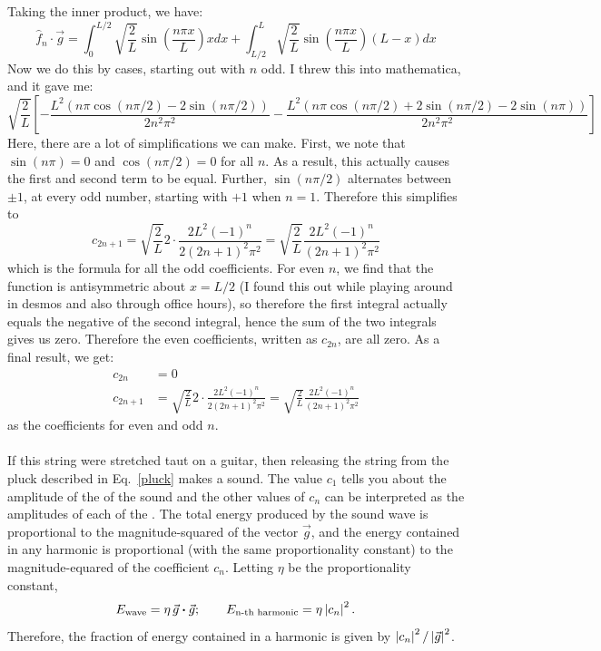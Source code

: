 \documentclass{article}
\begin{document}
\begin{solution}
    Taking the inner product, we have: 
    \[ \hat f_n \cdot \vec g = \int_0^{L/2} \sqrt{\frac 2L} \sin\left( \frac{n \pi x}{L}\right) x dx + \int_{L/2}^L \sqrt{\frac 2L } \sin \left( \frac{n \pi x}{L}\right) (L - x) dx \]
    Now we do this by cases, starting out with $n$ odd. I threw this into mathematica, and it gave me: %
    \[ \sqrt{\frac 2L} \left[ -\frac{L^2(n \pi \cos(n \pi /2) - 2 \sin(n \pi /2))}{2n^2\pi^2} - \frac{L^2(n \pi \cos(n \pi /2) + 2\sin(n \pi /2) - 2 \sin (n\pi))}{2n^2 \pi^2}\right] \]
    Here, there are a lot of simplifications we can make. First, we note that $\sin(n \pi) = 0$ and $\cos(n \pi/2) = 0$ for all $n$. As a result, this actually causes the first and second term to be equal. Further, $\sin(n \pi/2)$ alternates between $\pm 1$, at every odd number, starting with $+1$ when $n = 1$. Therefore this simplifies to
    \[c_{2n + 1} = \sqrt{\frac 2L} 2 \cdot \frac{2L^2(-1)^n}{2(2n+1)^2\pi^2} = \sqrt{\frac2L} \frac{2L^2(-1)^n}{(2n+1)^2\pi^2}\]
    which is the formula for all the odd coefficients. For even $n$, we find that the function is antisymmetric about $x = L/2$ (I found this out while playing around in desmos and also through office hours), so therefore the first integral actually equals the negative of the second integral, hence the sum of the two integrals gives us zero. Therefore the even coefficients, written as $c_{2n}$, are all zero. As a final result, we get: 
    \begin{align*}
        c_{2n} &= 0\\
        c_{2n + 1} &= \sqrt{\frac 2L} 2 \cdot \frac{2L^2(-1)^n}{2(2n+1)^2\pi^2} = \sqrt{\frac2L} \frac{2L^2(-1)^n}{(2n+1)^2\pi^2}
    \end{align*}
    as the coefficients for even and odd $n$.
\end{solution}

\paragraph{}
If this string were stretched taut on a guitar, then releasing the string from the pluck described in Eq.~\ref{pluck} makes a sound.  The value $c_{1}$ tells you about
the amplitude of the  of the sound and the other values of $c_{n}$ can be interpreted as the amplitudes of each of the .  The total energy 
produced by the sound wave is proportional to the magnitude-squared of the vector $\vec{g}$, and the energy contained in any harmonic is proportional (with the same proportionality constant)
to the magnitude-equared of the coefficient $c_{n}$.  Letting $\eta$ be the proportionality constant,
	\begin{equation*}
		E_{\textrm{wave}} = \eta\,\vec{g}\boldsymbol{\cdot}\vec{g};	\qquad	
		E_{\textrm{n-th harmonic}} = \eta\left|{c_{n}}\right|^{2}.
	\end{equation*}
Therefore, the fraction of energy contained in a harmonic is given by $\left|{c_{n}}\right|^{2}/\left|{\vec{g}}\right|^{2}$.
\end{document}
